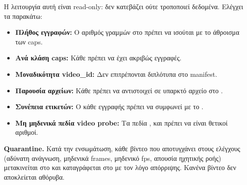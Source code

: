 Η λειτουργία αυτή είναι read-only: δεν κατεβάζει ούτε τροποποιεί δεδομένα.
Ελέγχει τα παρακάτω:

\begin{itemize}
  \item \textbf{Πλήθος εγγραφών:} Ο αριθμός γραμμών στο 
    πρέπει να ισούται με το άθροισμα των caps.
  \item \textbf{Ανά κλάση caps:} Κάθε  πρέπει να έχει
    ακριβώς  εγγραφές.
  \item \textbf{Μοναδικότητα video\_id:} Δεν επιτρέπονται διπλότυπα
     στο manifest.
  \item \textbf{Παρουσία αρχείων:} Κάθε  πρέπει να αντιστοιχεί
    σε υπαρκτό αρχείο  στο .
  \item \textbf{Συνέπεια ετικετών:} Ο  κάθε εγγραφής
    πρέπει να συμφωνεί με το .
  \item \textbf{Μη μηδενικά πεδία video probe:} Τα πεδία ,
     και  πρέπει να είναι θετικοί αριθμοί.
\end{itemize}

\textbf{Quarantine.} Κατά την ενσωμάτωση, κάθε βίντεο που αποτυγχάνει
στους ελέγχους (αδύνατη ανάγνωση, μηδενικά frames, μηδενικό fps,
απουσία ηχητικής ροής) μετακινείται στο 
και καταγράφεται στο  με τον λόγο απόρριψης.
Κανένα βίντεο δεν αποκλείεται αθόρυβα.
